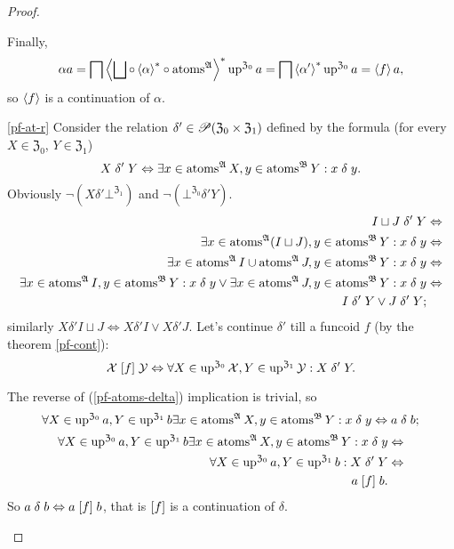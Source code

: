 \begin{proof}
\begin{widedisorder}
Finally,
\[
\alpha a=\bigsqcap\rsupfun{\bigsqcup\circ\rsupfun{\alpha}\circ\atoms^{\mathfrak{A}}}\up^{\mathfrak{Z}_{0}}a=\bigsqcap\rsupfun{\alpha'}\up^{\mathfrak{Z}_{0}}a=\supfun fa,
\]
so $\left\langle f\right\rangle$ is a continuation of $\alpha$.

\item [{\ref{pf-at-r}}] Consider the relation $\delta'\in\mathscr{P}(\mathfrak{Z}_{0}\times\mathfrak{Z}_{1})$
defined by the formula (for every $X\in\mathfrak{Z}_{0}$, $Y\in\mathfrak{Z}_{1}$)
\[
X\mathrel{\delta'}Y\Leftrightarrow\exists x\in\operatorname{atoms}^{\mathfrak{A}}X,y\in\operatorname{atoms}^{\mathfrak{B}}Y:x\mathrel{\delta}y.
\]
Obviously $\neg(X\mathrel{\delta'}\bot^{\mathfrak{Z}_{1}})$ and $\neg(\bot^{\mathfrak{Z}_{0}}\mathrel{\delta'}Y)$.
\begin{align*}
I\sqcup J\mathrel{\delta'}Y & \Leftrightarrow\\
\exists x\in\operatorname{atoms}^{\mathfrak{A}}(I\sqcup J),y\in\operatorname{atoms}^{\mathfrak{B}}Y:x\mathrel{\delta}y & \Leftrightarrow\\
\exists x\in\operatorname{atoms}^{\mathfrak{A}}I\cup\operatorname{atoms}^{\mathfrak{A}}J,y\in\operatorname{atoms}^{\mathfrak{B}}Y:x\mathrel{\delta}y & \Leftrightarrow\\
\exists x\in\operatorname{atoms}^{\mathfrak{A}}I,y\in\operatorname{atoms}^{\mathfrak{B}}Y:x\mathrel{\delta}y\lor\exists x\in\operatorname{atoms}^{\mathfrak{A}}J,y\in\operatorname{atoms}^{\mathfrak{B}}Y:x\mathrel{\delta}y & \Leftrightarrow\\
I\mathrel{\delta'}Y\lor J\mathrel{\delta'}Y;
\end{align*}
similarly $X\mathrel{\delta'}I\sqcup J\Leftrightarrow X\mathrel{\delta'}I\lor X\mathrel{\delta'}J$.
Let's continue $\delta'$ till a funcoid $f$ (by the theorem \ref{pf-cont}):
\[
\mathcal{X}\mathrel{\left[f\right]}\mathcal{Y}\Leftrightarrow\forall X\in\operatorname{up}^{\mathfrak{Z}_{0}}\mathcal{X},Y\in\operatorname{up}^{\mathfrak{Z}_{1}}\mathcal{Y}:X\mathrel{\delta'}Y.
\]



The reverse of (\ref{pf-atoms-delta}) implication is trivial, so
\[
\forall X\in\operatorname{up}^{\mathfrak{Z}_{0}}a,Y\in\operatorname{up}^{\mathfrak{Z}_{1}}b\exists x\in\operatorname{atoms}^{\mathfrak{A}}X,y\in\operatorname{atoms}^{\mathfrak{B}}Y:x\mathrel{\delta}y\Leftrightarrow a\mathrel{\delta}b;
\]
\begin{align*}
\forall X\in\operatorname{up}^{\mathfrak{Z}_{0}}a,Y\in\operatorname{up}^{\mathfrak{Z}_{1}}b\exists x\in\operatorname{atoms}^{\mathfrak{A}}X,y\in\operatorname{atoms}^{\mathfrak{B}}Y:x\mathrel{\delta}y & \Leftrightarrow\\
\forall X\in\operatorname{up}^{\mathfrak{Z}_{0}}a,Y\in\operatorname{up}^{\mathfrak{Z}_{1}}b:X\mathrel{\delta'}Y & \Leftrightarrow\\
a\mathrel{\left[f\right]}b.
\end{align*}
So $a\mathrel\delta b\Leftrightarrow a\mathrel{\left[f\right]}b$, that is $\mathrel{\left[f\right]}$
is a continuation of $\delta$.

\end{widedisorder}
\end{proof}
